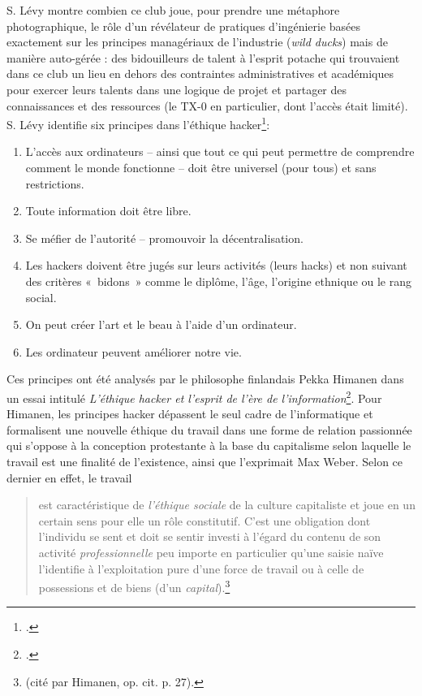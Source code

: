 \documentclass{FramateX}
\begin{document}
\begin{refsection}
S. Lévy montre combien ce club joue, pour prendre une métaphore
photographique, le rôle d'un révélateur de pratiques
d'ingénierie basées exactement sur les principes managériaux de
l'industrie (\textit{wild ducks}) mais de manière auto-gérée : des
bidouilleurs de talent à l'esprit potache qui
trouvaient dans ce club un lieu en dehors des contraintes
administratives et académiques pour exercer leurs talents dans une
logique de projet et partager des connaissances et des ressources (le
TX-0 en particulier, dont l'accès était limité). S.
Lévy identifie six principes dans l'éthique
hacker\footnote{\cite[p.~28~\textit{sq}]{levyhackers1994}.}:

\begin{enumerate}
\item L'accès aux ordinateurs -- ainsi que tout ce
qui peut permettre de comprendre comment le monde fonctionne -- doit
être universel (pour tous) et sans restrictions.
\item Toute information doit être libre.
\item Se méfier de l'autorité -- promouvoir la
décentralisation.
\item Les hackers doivent être jugés sur leurs activités (leurs hacks)
et non suivant des critères «~bidons~» comme le diplôme,
l'âge, l'origine ethnique ou le rang
social.
\item On peut créer l'art et le beau à
l'aide d'un ordinateur.
\item Les ordinateur peuvent améliorer notre vie.
\end{enumerate}
Ces principes ont été analysés par le philosophe finlandais Pekka
Himanen dans un essai intitulé \textit{L'éthique hacker et l'esprit de l'ère de l'information}\footnote{\cite{himanenethique2001}.}. Pour Himanen, les principes hacker dépassent le seul
cadre de l'informatique et formalisent une nouvelle
éthique du travail dans une forme de relation passionnée qui
s'oppose à la conception protestante à la base du
capitalisme selon laquelle le travail est une finalité de
l'existence, ainsi que l'exprimait
Max Weber. Selon ce dernier en effet, le travail 

\begin{quote}
est caractéristique de \textit{l'éthique sociale} de
la culture capitaliste et joue en un certain sens pour elle un rôle
constitutif. C'est une obligation dont
l'individu se sent et doit se sentir investi à
l'égard du contenu de son activité
\textit{professionnelle} peu importe en particulier
qu'une saisie naïve l'identifie à
l'exploitation pure d'une force de
travail ou à celle de possessions et de biens (d'un
\textit{capital}).\footnote{\cite[p.~94]{weberethique1999} (cité par Himanen, op. cit. p. 27).} 
\end{quote}


\end{refsection}
\end{document}
